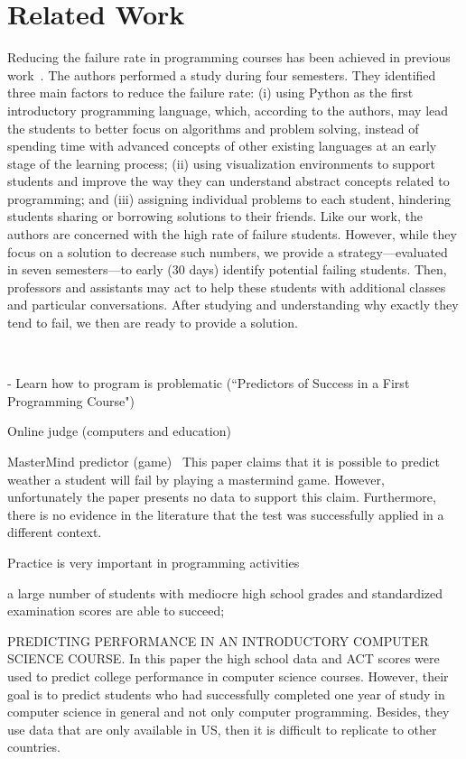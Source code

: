 \section{Related Work}

\label{sec:related}

Reducing the failure rate in programming courses has been achieved in previous work~\cite{}. The authors performed a study during four semesters. They identified three main factors to reduce the failure rate: (i) using Python as the first introductory programming language, which, according to the authors, may lead the students to better focus on algorithms and problem solving, instead of spending time with advanced concepts of other existing languages at an early stage of the learning process; (ii) using visualization environments to support students and improve the way they can understand abstract concepts related to programming; and (iii) assigning individual problems to each student, hindering students sharing or borrowing solutions to their friends. Like our work, the authors are concerned with the high rate of failure students. However, while they focus on a solution to decrease such numbers, we provide a strategy---evaluated in seven semesters---to early (30 days) identify potential failing students. Then, professors and assistants may act to help these students with additional classes and particular conversations. After studying and understanding why exactly they tend to fail, we then are ready to provide a solution. 

~\cite{camel-2006}

- Learn how to program is problematic (``Predictors of Success in a First Programming Course")~\cite{simon-predictors-ace2006}

Online judge (computers and education)~\cite{cheang-online-judge-2003}

MasterMind predictor (game)~\cite{lorenzenC06-mastermind-predictor-sigcse2008}
This paper claims that it is possible to predict weather a student will fail by playing a mastermind game. However, unfortunately the paper presents no data to support this claim. Furthermore, there is no evidence in the literature that the test was successfully applied in a different context.

Practice is very important in programming activities~\cite{on-automated-grading}

a large number of students with mediocre high school grades and standardized examination scores are able to succeed;~\cite{butcher-predictor-high-school-1985} 


PREDICTING PERFORMANCE IN AN INTRODUCTORY COMPUTER SCIENCE COURSE. In this paper the high school data and ACT scores were used to predict college performance in computer science courses. However, their goal is to predict students who had successfully completed one year of study in computer science in general and not only computer programming. Besides, they use data that are only available in US, then it is difficult to replicate to other countries. 
